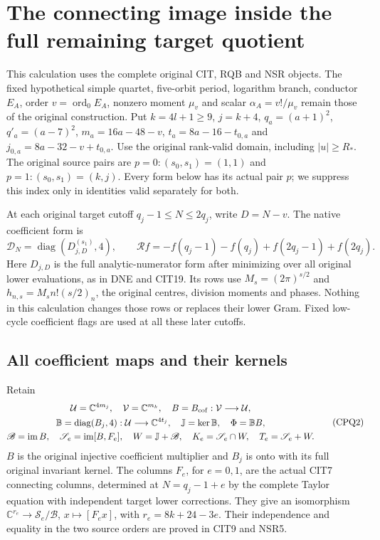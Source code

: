 \documentclass[11pt,a4paper]{article}
\begin{document}
\section{The connecting image inside the full remaining target quotient}
\label{sec:CPQ}

This calculation uses the complete original CIT, RQB and NSR objects.
The fixed hypothetical simple quartet, five-orbit period, logarithm
branch, conductor $E_A$, order $v=\operatorname{ord}_0 E_A$, nonzero
moment $\mu_v$ and scalar $\alpha_A=v!/\mu_v$ remain those of the
original construction. Put $k=4l+1\ge9$, $j=k+4$,
$q_a=(a+1)^2$, $q'_a=(a-7)^2$, $m_a=16a-48-v$,
$t_a=8a-16-t_{0,a}$ and $j_{0,a}=8a-32-v+t_{0,a}$.
Use the original rank-valid domain, including $|u|\ge R_*$.
The original source pairs are $p=0:(s_0,s_1)=(1,1)$ and
$p=1:(s_0,s_1)=(k,j)$. Every form below has its actual pair $p$;
we suppress this index only in identities valid separately for both.

At each original target cutoff $q_j-1\le N\le2q_j$, write $D=N-v$.
The native coefficient form is
\[
 \mathcal D_N=\operatorname{diag}(D_{j,D}^{(s_1)},4),\qquad
 \mathcal Rf=-f(q_j-1)-f(q_j)+f(2q_j-1)+f(2q_j).
 \tag{CPQ1}
\]
Here $D_{j,D}$ is the full analytic-numerator form after minimizing
over all original lower evaluations, as in DNE and CIT19. Its rows
use $M_s=(2\pi)^{s/2}$ and $h_{n,s}=M_s n!(s/2)_n$, the original
centres, division moments and phases. Nothing in this calculation
changes those rows or replaces their lower Gram. Fixed low-cycle
coefficient flags are used at all these later cutoffs.

\subsection{All coefficient maps and their kernels}
Retain
\[
 \begin{gathered}
 \mathcal U=\mathbb C^{4m_j},\quad \mathcal V=\mathbb C^{m_k},
 \quad B=B_{\rm cof}:\mathcal V\longrightarrow\mathcal U,\\
 \mathbb B=\operatorname{diag}(B_j,4):\mathcal U
                   \longrightarrow\mathbb C^{4t_j},\quad
 \mathbb J=\ker\mathbb B,\quad\Phi=\mathbb BB,\\
 \mathscr B=\operatorname{im}B,\quad
 \mathscr S_e=\operatorname{im}[B,F_e],\quad
 W=\mathbb J+\mathscr B,\quad
 K_e=\mathscr S_e\cap W,\quad T_e=\mathscr S_e+W.
 \end{gathered}\tag{CPQ2}
\]
$B$ is the original injective coefficient multiplier and $B_j$ is
onto with its full original invariant kernel. The columns $F_e$,
for $e=0,1$, are the actual CIT7 connecting columns, determined at
$N=q_j-1+e$ by the complete Taylor equation with independent target
lower corrections. They give an isomorphism
$\mathbb C^{r_e}\to\mathscr S_e/\mathscr B$,
$x\mapsto[F_ex]$, with $r_e=8k+24-3e$. Their independence and
equality in the two source orders are proved in CIT9 and NSR5.
\end{document}
